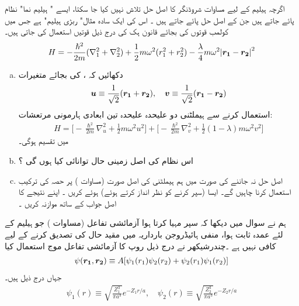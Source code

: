 اگرچہ ہیلیم کے لیے مساوات شروڈنگر کا  اصل    حل  تلاش نہیں کیا جا سکتا،  ایسے " ہیلیم نما"   نظام پائے جاتے ہیں جن کے  اصل  حل پائے جاتے  ہیں ۔ اس کی ایک  سادہ مثال"  ربڑی  ہیلیم" ہے جس میں کولمب قوتوں  کی بجائے قانون ہک کی درج ذیل قوتیں استعمال  کی جاتی ہیں۔
\begin{align}\label{مساوات_تغیریت_اصل_ہیملٹنی_ربڑی}
H=-\frac{\hslash^{2}}{2m}(\nabla_{1}^{2}+\nabla_{2}^{2})+\frac{1}{2}m\omega^{2}(r_{1}^{2}+r_{2}^{2})-\frac{\lambda}{4}m\omega^{2}\abs{{{\boldsymbol{r_{1}}}}-{{\boldsymbol{r_{2}}}}}^{2} 
\end{align}
\begin{enumerate}[a.]
\item
 دکھائیں کہ  ،    کی بجائے متغیرات
\begin{align}
{\ensuremath{{\boldsymbol{u}}}}\equiv\frac{1}{\sqrt{2}}({{\boldsymbol{r_{1}}}}+{{\boldsymbol{r_{2}}}}), \quad {\ensuremath{{\boldsymbol{v}}}}\equiv\frac{1}{\sqrt{2}}({{\boldsymbol{r_{1}}}}-{{\boldsymbol{r_{2}}}})
\end{align}
 استعمال کرنے سے ہیملٹنی دو علیحدہ علیحدہ تین ابعادی  ہارمونی  مرتعشات:
\begin{align}
H=\Big[-\frac{\hslash^{2}}{2m}\nabla_{u}^{2}+\frac{1}{2}m\omega^{2}u^{2}\Big]+\Big[-\frac{\hslash^{2}}{2m}\nabla_{v}^{2}+\frac{1}{2}(1-\lambda)m\omega^{2}v^{2}\Big]
\end{align}
  میں تقسیم ہوگی۔
\item
 اس نظام کی  اصل  زمینی حال توانائی کیا ہوں گی ؟
\item
 اصل  حل نہ جاننے کی  صورت میں ہم ہیملٹنی کی اصل صورت  (مساوات )   پر حصہ    کی ترکیب استعمال کرنا چاہیں گے۔
ایسا (سپر کرنے کو نظر انداز کرتے ہوئے)   ہوئے کریں ۔ اپنے نتیجے کا    اصل جواب کے ساتھ موازنہ کریں ۔    
\end{enumerate}
ہم نے سوال    میں دیکھا کہ  سپر مہیا کرتا ہوا آزمائشی تفاعل    (مساوات   ) جو  ہیلیم کے لئے عمدہ ثابت ہوا،   منفی ہائیڈروجن بارداریہ میں مقید حال  کی تصدیق کرنے کے لیے کافی نہیں ہے ۔چندرشیکھر  نے درج ذیل روپ  کا آزمائشی  تفاعل موج استعمال کیا
\begin{align}
\psi({{\boldsymbol{r_{1}}}},{{\boldsymbol{r_{2}}}})\equiv A[\psi_{1}(r_{1})\psi_{2}(r_{2})+\psi_{2}(r_{1})\psi_{1}(r_{2})]
\end{align}
 جہاں درج ذیل ہیں۔
\begin{align}
\psi_{1}(r)\equiv \sqrt{\frac{Z_{1}^{3}}{\pi a^{3}}}e^{-Z_{1}r/a}, \quad \psi_{2}(r)\equiv \sqrt{\frac{Z_{2}^{3}}{\pi a^{3}}}e^{-Z_{2}r/a} 
\end{align}
 
